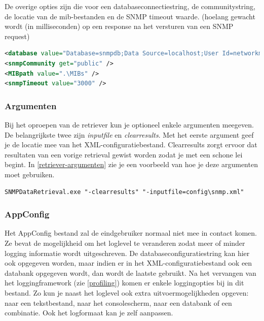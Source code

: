 De overige opties zijn die voor een databaseconnectiestring, de communitystring, de locatie van de \gls{mib}-bestanden en de SNMP timeout waarde.
(hoelang gewacht wordt (in milliseconden) op een response na het versturen van een SNMP request)

\begin{lstlisting}[language=XML, float=h, caption={Overige opties in het XML-configuratiebestand}, label=xmlconfig-misc]
<database value="Database=snmpdb;Data Source=localhost;User Id=networkminer;Password=SomePassword;Port=3306;old syntax=yes" />
<snmpCommunity get="public" />
<MIBpath value=".\MIBs" />
<snmpTimeout value="3000" />
\end{lstlisting}


\subsubsection{Argumenten}
Bij het oproepen van de retriever kun je optioneel enkele argumenten meegeven.
De belangrijkste twee zijn \emph{inputfile} en \emph{clearresults}.
Met het eerste argument geef je de locatie mee van het XML-configuratiebestand.
Clearresults zorgt ervoor dat resultaten van een vorige retrieval gewist worden zodat je met een schone lei begint.
In \cref{retriever-argumenten} zie je een voorbeeld van hoe je deze argumenten moet gebruiken.

\begin{lstlisting}[float=h, caption={Oproepen van SNMP Data Retriever met twee argumenten}, label=retriever-argumenten]
SNMPDataRetrieval.exe "-clearresults" "-inputfile=config\snmp.xml"
\end{lstlisting}



\subsubsection{AppConfig}
Het AppConfig bestand zal de eindgebruiker normaal niet mee in contact komen.
Ze bevat de mogelijkheid om het loglevel te veranderen zodat meer of minder logging informatie wordt uitgeschreven.
De databaseconfiguratiestring kan hier ook opgegeven worden,
maar indien er in het XML-configuratiebestand ook een databank opgegeven wordt, dan wordt de laatste gebruikt.
Na het vervangen van het loggingframework (zie \cref{profiling}) komen er enkele loggingopties bij in dit bestand.
Zo kun je naast het loglevel ook extra uitvoermogelijkheden opgeven: naar een tekstbestand, naar het consolescherm, naar een databank of een combinatie.
Ook het logformaat kan je zelf aanpassen.

